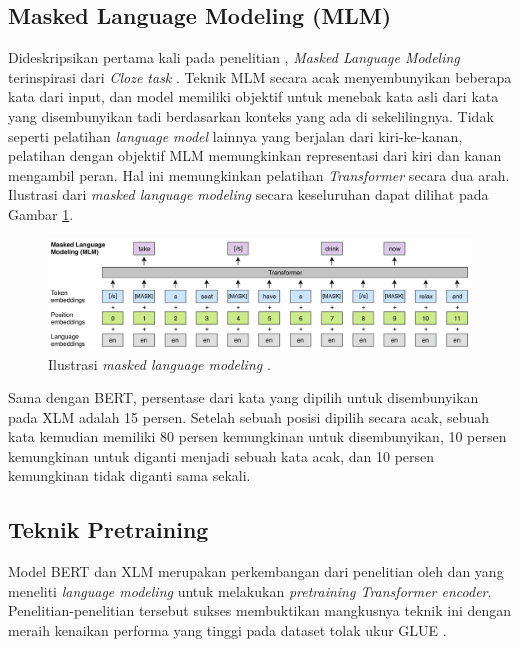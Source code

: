     \subsection{Masked Language Modeling (MLM)}
    Dideskripsikan pertama kali pada penelitian \parencite{Devlin_Chang_Lee_Toutanova_2019}, \textit{Masked Language Modeling} terinspirasi dari \textit{Cloze task} \parencite{Taylor_1953}. Teknik MLM secara acak menyembunyikan beberapa kata dari input, dan model memiliki objektif untuk menebak kata asli dari kata yang disembunyikan tadi berdasarkan konteks yang ada di sekelilingnya. Tidak seperti pelatihan \textit{language model} lainnya yang berjalan dari kiri-ke-kanan, pelatihan dengan objektif MLM memungkinkan representasi dari kiri dan kanan mengambil peran. Hal ini memungkinkan pelatihan \textit{Transformer} secara dua arah. Ilustrasi dari \textit{masked language modeling} secara keseluruhan dapat dilihat pada Gambar \ref{fig:ilustrasi_mlm}.

    \begin{figure}[ht]
        \centering
        \includegraphics[width=1\textwidth]{resources/ilustrasi-mlm.png}
        \caption{Ilustrasi \textit{masked language modeling} \parencite{LampleConneau2019}.}
        \label{fig:ilustrasi_mlm}
    \end{figure}

    Sama dengan BERT, persentase dari kata yang dipilih untuk disembunyikan pada XLM adalah 15 persen. Setelah sebuah posisi dipilih secara acak, sebuah kata kemudian memiliki 80 persen kemungkinan untuk disembunyikan, 10 persen kemungkinan untuk diganti menjadi sebuah kata acak, dan 10 persen kemungkinan tidak diganti sama sekali.

    \subsection{Teknik Pretraining}
    Model BERT dan XLM merupakan perkembangan dari penelitian oleh \parencite{radford2018improving} dan \parencite{HowardRuder2018} yang meneliti \textit{language modeling} untuk melakukan \textit{pretraining Transformer encoder}. Penelitian-penelitian tersebut sukses membuktikan mangkusnya teknik ini dengan meraih kenaikan performa yang tinggi pada dataset tolak ukur GLUE \parencite{GLUE2019}.

